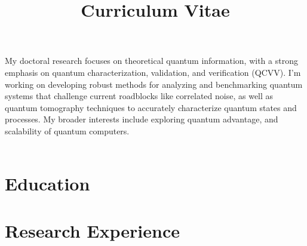 \documentclass[11pt,a4paper,sans]{moderncv} %
\title{Curriculum Vitae}
\begin{document}
\makecvtitle %

My doctoral research focuses on theoretical quantum information, with a strong emphasis on quantum characterization, validation, and verification (QCVV). I'm working on developing robust methods for analyzing and benchmarking quantum systems that challenge current roadblocks like correlated noise, as well as quantum tomography techniques to accurately characterize quantum states and processes. My broader interests include exploring quantum advantage, and scalability of quantum computers.
\\
\\


\section{Education}








\section{Research Experience}
\renewcommand{\listitemsymbol}{-~} %
\end{document}
